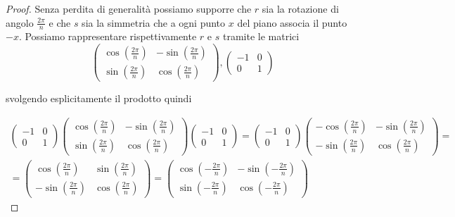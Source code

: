 \documentclass[11pt]{scrartcl}
\begin{document}
\begin{proof}
    Senza perdita di generalità possiamo supporre che $r$ sia la rotazione 
    di angolo $\displaystyle\frac{2\pi}{n}$ e che $s$ sia la simmetria che 
    a ogni punto $x$ del piano associa il punto $-x$. Possiamo rappresentare
    rispettivamente $r$ e $s$ tramite le matrici
    \begingroup
    \renewcommand{\arraystretch}{1.2}
    \[
        \begin{pmatrix}
            \cos\left(\frac{2\pi}{n}\right) & -\sin\left(\frac{2\pi}{n}\right)\\
            \sin\left(\frac{2\pi}{n}\right) & \cos\left(\frac{2\pi}{n}\right)
        \end{pmatrix},
        \begin{pmatrix}
            -1 & 0\\
            0 & 1
        \end{pmatrix}
    \]
    \endgroup

    svolgendo esplicitamente il prodotto quindi
    
    \begingroup
    \renewcommand{\arraystretch}{1.2}
    \begin{multline*}
        \begin{pmatrix}
            -1 & 0\\
            0 & 1
        \end{pmatrix}
        \begin{pmatrix}
            \cos\left(\frac{2\pi}{n}\right) & -\sin\left(\frac{2\pi}{n}\right)\\
            \sin\left(\frac{2\pi}{n}\right) & \cos\left(\frac{2\pi}{n}\right)
        \end{pmatrix}
        \begin{pmatrix}
            -1 & 0\\
            0 & 1
        \end{pmatrix} = 
        \begin{pmatrix}
            -1 & 0\\
            0 & 1
        \end{pmatrix}
        \begin{pmatrix}
            -\cos\left(\frac{2\pi}{n}\right) & -\sin\left(\frac{2\pi}{n}\right)\\
            -\sin\left(\frac{2\pi}{n}\right) & \cos\left(\frac{2\pi}{n}\right)
        \end{pmatrix} = \\ =
        \begin{pmatrix}
            \cos\left(\frac{2\pi}{n}\right) & \sin\left(\frac{2\pi}{n}\right)\\
            -\sin\left(\frac{2\pi}{n}\right) & \cos\left(\frac{2\pi}{n}\right)
        \end{pmatrix} = 
        \begin{pmatrix}
            \cos\left(-\frac{2\pi}{n}\right) & -\sin\left(-\frac{2\pi}{n}\right)\\
            \sin\left(-\frac{2\pi}{n}\right) & \cos\left(-\frac{2\pi}{n}\right)
        \end{pmatrix}
    \end{multline*}
    \endgroup
    

\end{proof}
\end{document}
